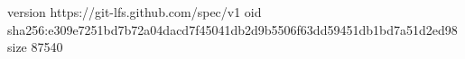 version https://git-lfs.github.com/spec/v1
oid sha256:e309e7251bd7b72a04dacd7f45041db2d9b5506f63dd59451db1bd7a51d2ed98
size 87540
